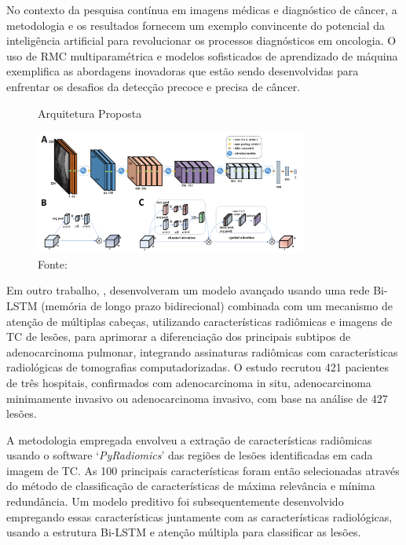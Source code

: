 No contexto da pesquisa contínua em imagens médicas e diagnóstico de câncer, a metodologia e os resultados fornecem um exemplo convincente do potencial da inteligência artificial para revolucionar os processos diagnósticos em oncologia. O uso de \gls{RMC} multiparamétrica e modelos sofisticados de aprendizado de máquina exemplifica as abordagens inovadoras que estão sendo desenvolvidas para enfrentar os desafios da detecção precoce e precisa de câncer.

\begin{figure}[htbp]
    \centering
    \caption{Arquitetura Proposta}
    \includegraphics[width=0.8\textwidth]{figures/fig007.png}
    \caption*{Fonte: \cite{jiangMRIBasedRadiomics2021}}
    \label{fig:fig007}
\end{figure}

Em outro trabalho, , desenvolveram um modelo avançado usando uma rede Bi-LSTM (memória de longo prazo bidirecional) combinada com um mecanismo de atenção de múltiplas cabeças, utilizando características radiômicas e imagens de \gls{TC} de lesões, para aprimorar a diferenciação dos principais subtipos de adenocarcinoma pulmonar, integrando assinaturas radiômicas com características radiológicas de tomografias computadorizadas. O estudo recrutou 421 pacientes de três hospitais, confirmados com adenocarcinoma in situ, adenocarcinoma minimamente invasivo ou adenocarcinoma invasivo, com base na análise de 427 lesões.

A metodologia empregada envolveu a extração de características radiômicas usando o software `\textit{PyRadiomics}' das regiões de lesões identificadas em cada imagem de \gls{TC}. As 100 principais características foram então selecionadas através do método de classificação de características de máxima relevância e mínima redundância. Um modelo preditivo foi subsequentemente desenvolvido empregando essas características juntamente com as características radiológicas, usando a estrutura Bi-LSTM e atenção múltipla para classificar as lesões.

